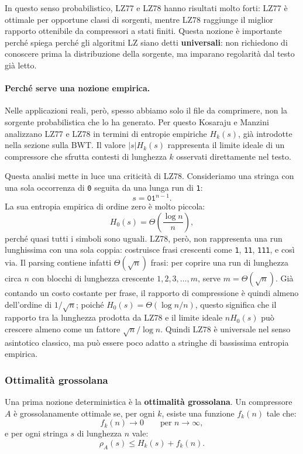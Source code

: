 \documentclass{article}
\theoremstyle{definition}
\numberwithin{equation}{section}
\begin{document}
In questo senso probabilistico, LZ77 e LZ78 hanno risultati molto forti: LZ77 è ottimale per opportune classi di sorgenti, mentre LZ78 raggiunge il miglior rapporto ottenibile da compressori a stati finiti. Questa nozione è importante perché spiega perché gli algoritmi LZ siano detti \textbf{universali}: non richiedono di conoscere prima la distribuzione della sorgente, ma imparano regolarità dal testo già letto.

\paragraph{Perché serve una nozione empirica.}
Nelle applicazioni reali, però, spesso abbiamo solo il file da comprimere, non la sorgente probabilistica che lo ha generato. Per questo Kosaraju e Manzini analizzano LZ77 e LZ78 in termini di entropie empiriche $H_k(s)$, già introdotte nella sezione sulla BWT. Il valore $|s|H_k(s)$ rappresenta il limite ideale di un compressore che sfrutta contesti di lunghezza $k$ osservati direttamente nel testo.

Questa analisi mette in luce una criticità di LZ78. Consideriamo una stringa con una sola occorrenza di \texttt{0} seguita da una lunga run di \texttt{1}:
\[
    s=\texttt{0}\texttt{1}^{n-1}.
\]
La sua entropia empirica di ordine zero è molto piccola:
\[
    H_0(s)=\Theta\!\left(\frac{\log n}{n}\right),
\]
perché quasi tutti i simboli sono uguali. LZ78, però, non rappresenta una run lunghissima con una sola coppia: costruisce frasi crescenti come \texttt{1}, \texttt{11}, \texttt{111}, e così via. Il parsing contiene infatti $\Theta(\sqrt n)$ frasi: per coprire una run di lunghezza circa $n$ con blocchi di lunghezza crescente $1,2,3,\ldots,m$, serve $m=\Theta(\sqrt n)$. Già contando un costo costante per frase, il rapporto di compressione è quindi almeno dell'ordine di $1/\sqrt n$; poiché $H_0(s)=\Theta(\log n/n)$, questo significa che il rapporto tra la lunghezza prodotta da LZ78 e il limite ideale $nH_0(s)$ può crescere almeno come un fattore $\sqrt n/\log n$. Quindi LZ78 è universale nel senso asintotico classico, ma può essere poco adatto a stringhe di bassissima entropia empirica.

\subsubsection{Ottimalità grossolana}
Una prima nozione deterministica è la \textbf{ottimalità grossolana}. Un compressore $A$ è grossolanamente ottimale se, per ogni $k$, esiste una funzione $f_k(n)$ tale che:
\[
    f_k(n)\to 0
    \qquad
    \text{per } n\to\infty,
\]
e per ogni stringa $s$ di lunghezza $n$ vale:
\[
    \rho_A(s)
    \leq
    H_k(s)+f_k(n).
\]
\end{document}
